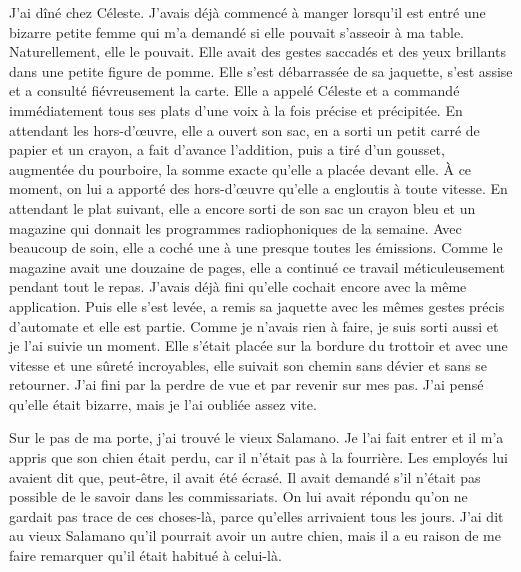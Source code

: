 \documentclass[french,twoside]{book} %
\begin{document}
J'ai dîné chez Céleste. J'avais déjà commencé à manger lorsqu’il est entré une bizarre petite femme qui m’a demandé si elle pouvait s’asseoir à ma table. Naturellement, elle le pouvait. Elle avait des gestes saccadés et des yeux brillants dans une petite figure de pomme. Elle s’est débarrassée de sa jaquette, s’est assise et a consulté fiévreusement la carte. Elle a appelé Céleste et a commandé immédiatement tous ses plats d’une voix à la fois précise et précipitée. En attendant les hors-d’œuvre, elle a ouvert son sac, en a sorti un petit carré de papier et un crayon, a fait d’avance l’addition, puis a tiré d’un gousset, augmentée du pourboire, la somme exacte qu’elle a placée devant elle. À ce moment, on lui a apporté des hors-d’œuvre qu’elle a engloutis à toute vitesse. En attendant le plat suivant, elle a encore sorti de son sac un crayon bleu et un magazine qui donnait les programmes radiophoniques de la semaine. Avec beaucoup de soin, elle a coché une à une presque toutes les émissions. Comme le magazine avait une douzaine de pages, elle a continué ce travail méticuleusement pendant tout le repas. J'avais déjà fini qu’elle cochait encore avec la même application. Puis elle s’est levée, a remis sa jaquette avec les mêmes gestes précis d’automate et elle est partie. Comme je n’avais rien à faire, je suis sorti aussi et je l’ai suivie un moment. Elle s’était placée sur la bordure du trottoir et avec une vitesse et une sûreté incroyables, elle suivait son chemin sans dévier et sans se retourner. J'ai fini par la perdre de vue et par revenir sur mes pas. J'ai pensé qu’elle était bizarre, mais je l’ai oubliée assez vite.\par
Sur le pas de ma porte, j’ai trouvé le vieux Salamano. Je l’ai fait entrer et il m’a appris que son chien était perdu, car il n’était pas à la fourrière. Les employés lui avaient dit que, peut-être, il avait été écrasé. Il avait demandé s’il n’était pas possible de le savoir dans les commissariats. On lui avait répondu qu’on ne gardait pas trace de ces choses-là, parce qu’elles arrivaient tous les jours. J'ai dit au vieux Salamano qu’il pourrait avoir un autre chien, mais il a eu raison de me faire remarquer qu’il était habitué à celui-là.\par
\end{document}
